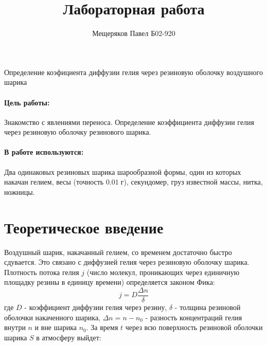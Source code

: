 \documentclass[a4paper,12pt]{article}
\author{Мещеряков Павел Б02-920}
\title{Лабораторная работа }
\begin{document}
		\maketitle
	\begin{center}
		{\Large Определение коэфициента диффузии гелия через резиновую оболочку воздушного шарика}
	\end{center}
	\paragraph{Цель работы:} Знакомство с явлениями переноса. Определение коэффициента диффузии гелия через резиновую оболочку резинового шарика. 
\paragraph{В работе используются:}  Два одинаковых резиновых шарика шарообразной формы, один из которых накачан гелием, весы (точность $0.01 \; г$), секундомер, груз известной массы, нитка, ножницы.
 
\section{Теоретическое введение}

Воздушный шарик, накачанный гелием, со временем достаточно быстро сдувается. Это связано с диффузией гелия через резиновую оболочку шарика. Плотность потока гелия 
$ j$ (число молекул, проникающих через единичную площадку резины в единицу времени) определяется законом Фика:
\begin{equation}
j=D\frac {\Delta n }{\delta}
\end{equation}
где $D$ - коэффициент диффузии гелия через резину, $\delta$ - толщина резиновой оболочки накаченного шарика, $\Delta n =n-n_0$ - разность концентраций гелия внутри $n$ и вне шарика $n_0$.
За время $t$ через всю поверхность резиновой оболочки шарика $S$ в атмосферу выйдет:
\end{document}
